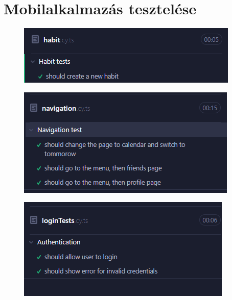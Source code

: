 \documentclass[12pt]{report}
\begin{document}
\section{Mobilalkalmazás tesztelése}
\begin{figure}[H]
    \centering
    \begin{minipage}[b]{0.3\textwidth}
        \centering
        \includegraphics[width=\linewidth]{src/habittest.png}
        \label{fig:img1}
    \end{minipage}
    \hspace{0.03\textwidth}
    \begin{minipage}[b]{0.3\textwidth}
        \centering
        \includegraphics[width=\linewidth]{src/navigationtest.png}
        \label{fig:img2}
    \end{minipage}
    \hspace{0.03\textwidth}
    \begin{minipage}[b]{0.3\textwidth}
        \centering
        \includegraphics[width=\linewidth]{src/logintest.png}
        \label{fig:img3}
    \end{minipage}
\end{figure}
\end{document}
